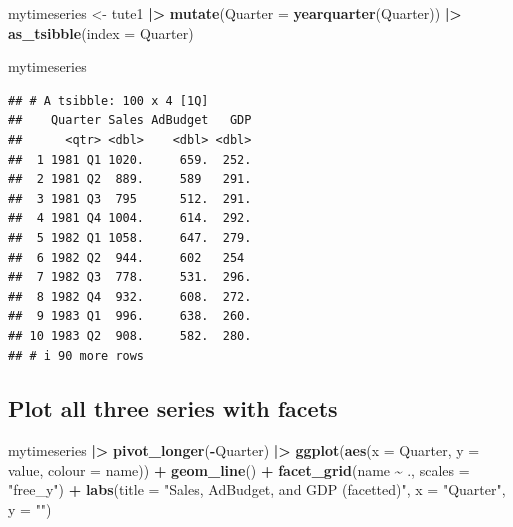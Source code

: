 \documentclass[
  11pt,
]{article}
\newenvironment{Shaded}{\begin{snugshade}}{\end{snugshade}}
\newcommand{\AttributeTok}[1]{\textcolor[rgb]{0.13,0.29,0.53}{#1}}
\newcommand{\FunctionTok}[1]{\textcolor[rgb]{0.13,0.29,0.53}{\textbf{#1}}}
\newcommand{\NormalTok}[1]{#1}
\newcommand{\OtherTok}[1]{\textcolor[rgb]{0.56,0.35,0.01}{#1}}
\newcommand{\SpecialCharTok}[1]{\textcolor[rgb]{0.81,0.36,0.00}{\textbf{#1}}}
\newcommand{\StringTok}[1]{\textcolor[rgb]{0.31,0.60,0.02}{#1}}
\begin{document}
\begin{Shaded}
\begin{Highlighting}[]
\NormalTok{mytimeseries }\OtherTok{\textless{}{-}}\NormalTok{ tute1 }\SpecialCharTok{|\textgreater{}}
  \FunctionTok{mutate}\NormalTok{(}\AttributeTok{Quarter =} \FunctionTok{yearquarter}\NormalTok{(Quarter)) }\SpecialCharTok{|\textgreater{}}
  \FunctionTok{as\_tsibble}\NormalTok{(}\AttributeTok{index =}\NormalTok{ Quarter)}

\NormalTok{mytimeseries}
\end{Highlighting}
\end{Shaded}

\begin{verbatim}
## # A tsibble: 100 x 4 [1Q]
##    Quarter Sales AdBudget   GDP
##      <qtr> <dbl>    <dbl> <dbl>
##  1 1981 Q1 1020.     659.  252.
##  2 1981 Q2  889.     589   291.
##  3 1981 Q3  795      512.  291.
##  4 1981 Q4 1004.     614.  292.
##  5 1982 Q1 1058.     647.  279.
##  6 1982 Q2  944.     602   254 
##  7 1982 Q3  778.     531.  296.
##  8 1982 Q4  932.     608.  272.
##  9 1983 Q1  996.     638.  260.
## 10 1983 Q2  908.     582.  280.
## # i 90 more rows
\end{verbatim}

\subsection{Plot all three series with
facets}\label{plot-all-three-series-with-facets}

\begin{Shaded}
\begin{Highlighting}[]
\NormalTok{mytimeseries }\SpecialCharTok{|\textgreater{}}
  \FunctionTok{pivot\_longer}\NormalTok{(}\SpecialCharTok{{-}}\NormalTok{Quarter) }\SpecialCharTok{|\textgreater{}}
  \FunctionTok{ggplot}\NormalTok{(}\FunctionTok{aes}\NormalTok{(}\AttributeTok{x =}\NormalTok{ Quarter, }\AttributeTok{y =}\NormalTok{ value, }\AttributeTok{colour =}\NormalTok{ name)) }\SpecialCharTok{+}
  \FunctionTok{geom\_line}\NormalTok{() }\SpecialCharTok{+}
  \FunctionTok{facet\_grid}\NormalTok{(name }\SpecialCharTok{\textasciitilde{}}\NormalTok{ ., }\AttributeTok{scales =} \StringTok{"free\_y"}\NormalTok{) }\SpecialCharTok{+}
  \FunctionTok{labs}\NormalTok{(}\AttributeTok{title =} \StringTok{"Sales, AdBudget, and GDP (facetted)"}\NormalTok{, }\AttributeTok{x =} \StringTok{"Quarter"}\NormalTok{, }\AttributeTok{y =} \StringTok{""}\NormalTok{)}
\end{Highlighting}
\end{Shaded}
\end{document}
